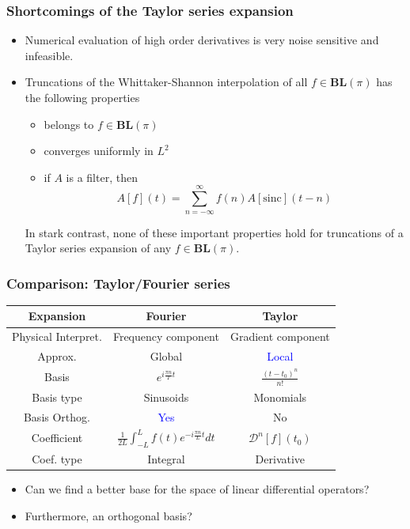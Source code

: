 \documentclass{beamer}
\begin{document}

\begin{frame}
\frametitle{Shortcomings of the Taylor series expansion}
\begin{itemize}
	\item Numerical evaluation of high order derivatives is \alert{very noise
		sensitive and infeasible.}
	\item Truncations of the Whittaker-Shannon interpolation of all 
		$f \in \mathbf{BL}(\pi)$ has the following properties
		\begin{itemize}
			\item belongs to $f \in \mathbf{BL}(\pi)$
			\item converges uniformly in $L^2$
			\item if $A$ is a filter, then
				\begin{equation*}
					A[f](t) = \sum_{n=-\infty}^{\infty} f(n) A[\mathrm{sinc}](t-n)
				\end{equation*}
		\end{itemize}
		In stark contrast, \alert{none of these important properties hold} for
		truncations of a Taylor series expansion of any $f \in \mathbf{BL}(\pi)$.
\end{itemize}
\end{frame}


\begin{frame}
\frametitle{Comparison: Taylor/Fourier series}
\begin{table}
\begin{tabular}{c c c}
\toprule
Expansion & \textbf{Fourier} & \textbf{Taylor}\\
\midrule
Physical Interpret. & Frequency component & Gradient component \\
Approx. & Global & \textcolor{blue}{Local} \\
Basis			& $e^{i \frac{\pi n}{T} t}$ & $\frac{(t-t_0)^n}{n!}$ \\
Basis type 		 & Sinusoids & Monomials \\
Basis Orthog.& \textcolor{blue}{Yes} & \alert{No} \\
Coefficient & $\frac{1}{2L} \int_{-L}^{L} f(t) e^{-i \frac{\pi n}{L} t} dt$ & $\mathcal{D}^n[f](t_0)$ \\
Coef. type  & Integral & \alert{Derivative} \\
\bottomrule
\end{tabular}
\end{table}

\begin{itemize}
	\item Can we find a better base for the space of linear differential operators?
	\item Furthermore, an \alert{orthogonal basis}?
\end{itemize}
\end{frame}
\end{document}
